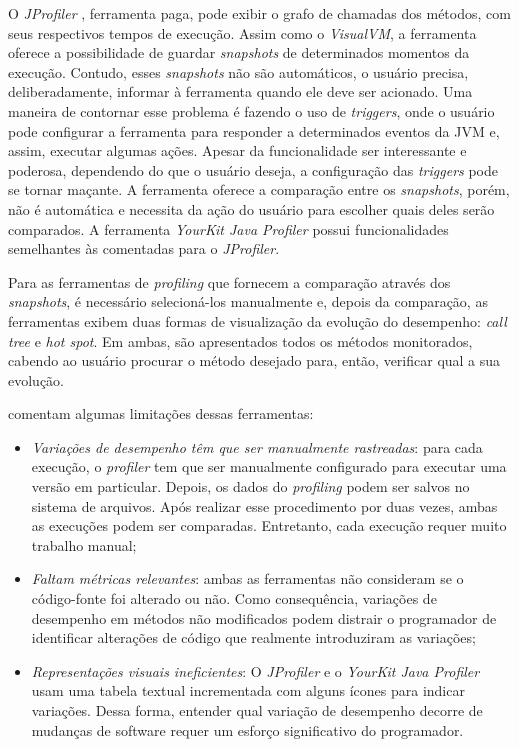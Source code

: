 O \textit{JProfiler} \cite{JProfiler}, ferramenta paga, pode exibir o grafo de chamadas dos métodos, com seus respectivos tempos de execução. Assim como o \textit{VisualVM}, a ferramenta oferece a possibilidade de guardar \textit{snapshots} de determinados momentos da execução. Contudo, esses \textit{snapshots} não são automáticos, o usuário precisa, deliberadamente, informar à ferramenta quando ele deve ser acionado. Uma maneira de contornar esse problema é fazendo o uso de \textit{triggers}, onde o usuário pode configurar a ferramenta para responder a determinados eventos da JVM e, assim, executar algumas ações. Apesar da funcionalidade ser interessante e poderosa, dependendo do que o usuário deseja, a configuração das \textit{triggers} pode se tornar maçante. A ferramenta oferece a comparação entre os \textit{snapshots}, porém, não é automática e necessita da ação do usuário para escolher quais deles serão comparados. A ferramenta \textit{YourKit Java Profiler} \cite{Profiler2016} possui funcionalidades semelhantes às comentadas para o \textit{JProfiler}.

Para as ferramentas de \textit{profiling} que fornecem a comparação através dos \textit{snapshots}, é necessário selecioná-los manualmente e, depois da comparação, as ferramentas exibem duas formas de visualização da evolução do desempenho: \textit{call tree} e \textit{hot spot}. Em ambas, são apresentados todos os métodos monitorados, cabendo ao usuário procurar o método desejado para, então, verificar qual a sua evolução.

\citeauthor{SandovalAlcocer2013} comentam algumas limitações dessas ferramentas:
\begin{itemize}
	\item \textit{Variações de desempenho têm que ser manualmente rastreadas}: para cada execução, o \textit{profiler} tem que ser manualmente configurado para executar uma versão em particular. Depois, os dados do \textit{profiling} podem ser salvos no sistema de arquivos. Após realizar esse procedimento por duas vezes, ambas as execuções podem ser comparadas. Entretanto, cada execução requer muito trabalho manual;
	\item \textit{Faltam métricas relevantes}: ambas as ferramentas não consideram se o código-fonte foi alterado ou não. Como consequência, variações de desempenho em métodos não modificados podem distrair o programador de identificar alterações de código que realmente introduziram as variações;
	\item \textit{Representações visuais ineficientes}: O \textit{JProfiler} e o \textit{YourKit Java Profiler} usam uma tabela textual incrementada com alguns ícones para indicar variações. Dessa forma, entender qual variação de desempenho decorre de mudanças de software requer um esforço significativo do programador.
\end{itemize}

